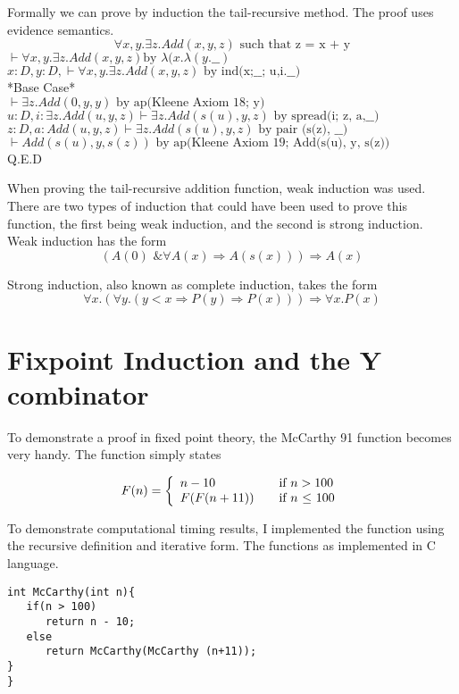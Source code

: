 \documentclass{article}
\begin{document}
Formally we can prove by induction the tail-recursive method. The proof uses evidence semantics.  
\[\forall x, y.\exists z.Add(x,y,z) \text{ such that z = x + y}\]
$\vdash \forall x, y.\exists z.Add(x,y,z)\text{by }\lambda(x.\lambda(y.\_\_)$\\
$x:D, y:D, \vdash \forall x, y.\exists z.Add(x,y,z) \text{ by ind(x;\_\_; u,i.\_\_)}$\\
*Base Case*\\
$\vdash \exists z.Add(0,y,y) \text{ by ap(Kleene Axiom 18; y) }$\\
$u:D, i: \exists z.Add(u,y,z) \vdash \exists z.Add(s(u),y,z)\text{ by spread(i; z, a,\_\_)}$\\
$z:D, a:Add(u,y,z) \vdash \exists z.Add(s(u),y,z)\text{ by pair (s(z), \_\_) }$\\
$\vdash Add(s(u), y , s(z)) \text{ by ap(Kleene Axiom 19; Add(s(u), y, s(z))}$\\


Q.E.D

When proving the tail-recursive addition function, weak induction was used. There are two types of induction that could have been used to prove this function, the first being weak induction, and the second is strong induction. Weak induction has the form \[ (A(0) \text{ \& } \forall A(x) \Rightarrow A(s(x))) \Rightarrow A(x)\]

Strong induction, also known as complete induction, takes the form \[ \forall x.(\forall y.(y < x \Rightarrow P(y) \Rightarrow P(x)))\Rightarrow \forall x.P(x) \]

\section{Fixpoint Induction and the Y combinator}

To demonstrate a proof in fixed point theory, the McCarthy 91 function becomes very handy. The function simply states 

\[
  F(n) = \left\{ 
  \begin{array}{l l}
    n-10 & \quad \text{if $n > 100$}\\
    F(F(n+11)) & \quad \text{if $n$ $\leq$ 100}\\
  \end{array} \right.
\]

To demonstrate computational timing results, I implemented the function using the recursive definition and iterative form. The functions as implemented in C language. 

\begin{lstlisting}
int McCarthy(int n){ 
   if(n > 100)
      return n - 10; 
   else
      return McCarthy(McCarthy (n+11));
}
}
\end{lstlisting}
\end{document}
